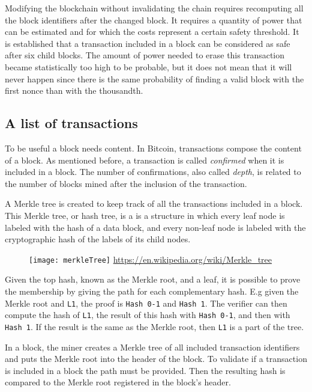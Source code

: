 Modifying the blockchain without invalidating the chain requires recomputing all
the block identifiers after the changed block. It requires a quantity of power
that can be estimated and for which the costs represent a certain safety
threshold. It is established that a transaction included in a block can be
considered as safe after six child blocks. The amount of power needed to erase
this transaction became statistically too high to be probable, but it does not
mean that it will never happen since there is the same probability of finding a
valid block with the first nonce than with the thousandth.

\subsection{A list of transactions}

To be useful a block needs content. In Bitcoin, transactions compose the
content of a block. As mentioned before, a transaction is called
\textit{confirmed} when it is included in a block. The number of confirmations,
also called \textit{depth}, is related to the number of blocks mined after the
inclusion of the transaction.

A Merkle tree is created to keep track of all the transactions included in a
block. This Merkle tree, or hash tree, is a is a structure in which every leaf
node is labeled with the hash of a data block, and every non-leaf node is
labeled with the cryptographic hash of the labels of its child nodes.

\begin{figure}[H]
	\centering
	\texttt{[image: merkleTree]}
	{\url{https://en.wikipedia.org/wiki/Merkle_tree}}
	\label{fig:merkleTree}
\end{figure}

Given the top hash, known as the Merkle root, and a leaf, it is possible to prove the
membership by giving the path for each complementary hash. E.g given the
Merkle root and \texttt{L1}, the proof is \texttt{Hash 0-1} and \texttt{Hash 1}.
The verifier can then compute the hash of \texttt{L1}, the result of this hash
with \texttt{Hash 0-1}, and then with \texttt{Hash 1}. If the result is the same
as the Merkle root, then \texttt{L1} is a part of the tree.

In a block, the miner creates a Merkle tree of all included transaction
identifiers and puts the Merkle root into the header of the block. To validate
if a transaction is included in a block the path must be provided. Then the
resulting hash is compared to the Merkle root registered in the block's header.

